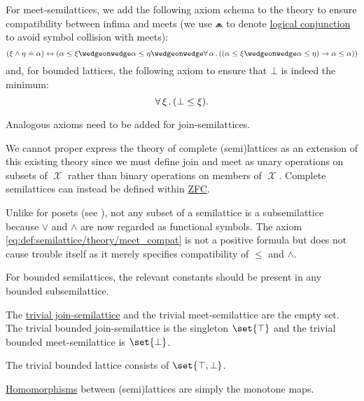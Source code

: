 \begin{definition}
\begin{thmenum}[resume=def:semilattice]
    For meet-semilattices, we add the following axiom schema to the theory to ensure compatibility between infima and meets (we use \( \wedgeonwedge \) to denote \hyperref[def:propositional_language/connectives/conjunction]{logical conjunction} to avoid symbol collision with meets):
    \begin{equation}\label{eq:def:semilattice/theory/meet_compat}
      (\xi \wedge \eta \doteq \alpha) \leftrightarrow (\alpha \leq \xi \wedgeonwedge \alpha \leq \eta \wedgeonwedge \qforall \alpha ((\alpha \leq \xi \wedgeonwedge \alpha \leq \eta) \rightarrow \alpha \leq \alpha))
    \end{equation}
    and, for bounded lattices, the following axiom to ensure that \( \bot \) is indeed the minimum:
    \begin{equation}\label{eq:def:semilattice/theory/bottom_compat}
      \forall \thinspace \xi \thinspace . \thinspace (\bot \leq \xi).
    \end{equation}

    Analogous axioms need to be added for join-semilattices.

    We cannot proper express the theory of complete (semi)lattices as an extension of this existing theory since we must define join and meet as unary operations on subsets of \( \mscrX \) rather than binary operations on members of \( \mscrX \). Complete semilattices can instead be defined within \hyperref[def:zfc]{ZFC}.

     Unlike for posets (see ), not any subset of a semilattice is a subsemilattice because \( \vee \) and \( \wedge \) are now regarded as functional symbols. The axiom \eqref{eq:def:semilattice/theory/meet_compat} is not a positive formula but does not cause trouble itself as it merely specifies compatibility of \( \leq \) and \( \wedge \).

    For bounded semilattices, the relevant constants should be present in any bounded subsemilattice.

     The \hyperref[thm:substructures_form_complete_lattice/bottom]{trivial join-semilattice} and the trivial meet-semilattice are the empty set. The trivial bounded join-semilattice is the singleton \( \set{ \top } \) and the trivial bounded meet-semilattice is \( \set{ \bot } \).

    The trivial bounded lattice consists of \( \set{ \top, \bot } \).

     \hyperref[def:first_order_homomorphism]{Homomorphisms} between (semi)lattices are simply the monotone maps.


\end{thmenum}
\end{definition}
